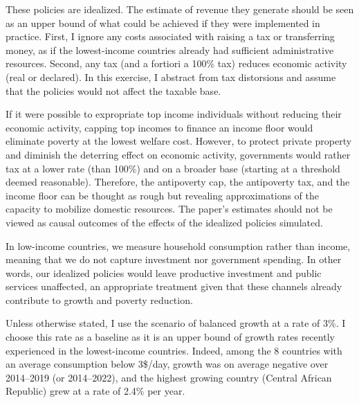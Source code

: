 These policies are idealized. The estimate of revenue they generate should be seen as an upper bound of what could be achieved if they were implemented in practice. 
First, I ignore any costs associated with raising a tax or transferring money, as if the lowest-income countries already had sufficient administrative resources. Second, any tax (and a fortiori a 100\% tax) reduces economic activity (real or declared). In this exercise, I abstract from tax distorsions and assume that the policies would not affect the taxable base.%

If it were possible to expropriate top income individuals 
without reducing their economic activity, capping top incomes to finance an income floor would eliminate poverty at the lowest welfare cost. 
However, to protect private property and diminish the deterring effect on economic activity, governments would rather tax at a lower rate (than 100\%) and on a broader base (starting at a threshold deemed reasonable). 
Therefore, the antipoverty cap, the antipoverty tax, and the income floor can be thought as rough but revealing approximations of the capacity to mobilize domestic resources. The paper's estimates should not be viewed as causal outcomes of the effects of the idealized policies simulated.

In low-income countries, we measure household consumption rather than income, meaning that we do not capture investment nor government spending. In other words, our idealized policies would leave productive investment and public services unaffected, an appropriate treatment given that these channels already contribute to growth and poverty reduction.%

Unless otherwise stated, I use the scenario of balanced growth at a rate of 3\%. I choose this rate as a baseline as it is an upper bound of growth rates recently experienced in the lowest-income countries. Indeed, among the 8 countries with an average consumption below 3\$/day, growth was on average negative over 2014--2019 (or 2014--2022), and the highest growing country (Central African Republic) grew at a rate of 2.4\% per year. %

